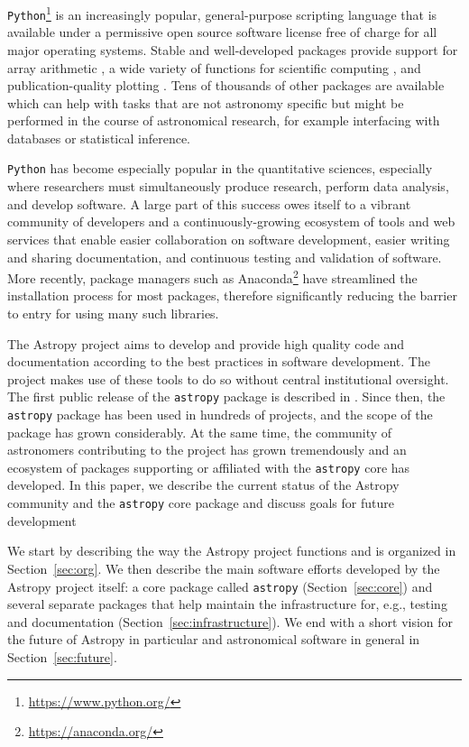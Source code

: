 \documentclass[modern]{aastex61}
\newcommand{\package}[1]{\texttt{#1}\xspace}
\newcommand{\python}{\package{Python}}
\newcommand{\astropy}{Astropy\xspace}
\newcommand{\astropypkg}{\package{astropy}}
\newcommand{\sectionname}{Section\xspace}
\begin{document}
\python\footnote{\url{https://www.python.org/}} is an increasingly popular,
general-purpose scripting language that is available under a permissive open
source software license free of charge for all major operating systems.
Stable and well-developed packages provide support for array arithmetic
\citep[\package{numpy};][]{numpy}, a wide variety of functions for scientific
computing \citep[\package{scipy};][]{numpy}, and publication-quality plotting
\citep[\package{matplotlib};][]{matplotlib}. Tens of thousands of other packages
are available which can help with tasks that are not astronomy specific but
might be performed in the course of astronomical research, for example interfacing with databases or statistical inference.

\python has become especially popular in the quantitative sciences, especially
where researchers must simultaneously produce research, perform data analysis,
and develop software.
A large part of this success owes itself to a vibrant community of developers
and a continuously-growing ecosystem of tools and web services that enable
easier collaboration on software development, easier writing and sharing
documentation, and continuous testing and validation of software.
More recently, package managers such as
Anaconda\footnote{\url{https://anaconda.org/}} have streamlined the installation
process for most packages, therefore significantly reducing the barrier to entry
for using many such libraries.

The \astropy project aims to develop and provide high quality code and
documentation according to the best practices in software development.
The project makes use of these tools to do so without central institutional
oversight.
The first public release of the \astropypkg package is described in
\cite{astropy}. Since then, the \astropypkg package has been
used in hundreds of projects, and the scope of the package has grown
considerably. At the same time, the community of astronomers
contributing to the project has grown tremendously and an ecosystem
of packages supporting or affiliated with the \astropypkg core has
developed.
In this paper, we describe the current status of the \astropy community and the
\astropypkg core package and discuss goals for future development

We start by describing the way the \astropy project functions and is organized
in \sectionname~\ref{sec:org}. We then describe the main software efforts
developed by the \astropy project itself: a core package called \astropypkg
(\sectionname~\ref{sec:core}) and several separate packages that help maintain
the infrastructure for, e.g., testing and documentation
(\sectionname~\ref{sec:infrastructure}). We end with a short vision for
the future of \astropy in particular and astronomical software in general
in \sectionname~\ref{sec:future}.
\end{document}
